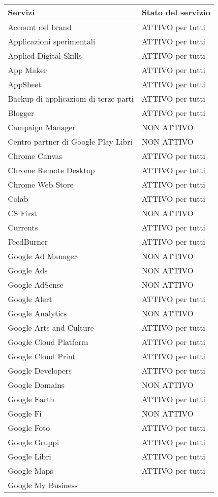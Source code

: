 \begin{center}
	\begin{tabular}{ll}
	\toprule
	Servizi&Stato del servizio\\
	\midrule 
Account del brand&
ATTIVO per tutti\\
Applicazioni sperimentali&
ATTIVO per tutti\\
Applied Digital Skills&
ATTIVO per tutti\\
App Maker&
ATTIVO per tutti\\
AppSheet&
ATTIVO per tutti\\
Backup di applicazioni di terze parti&
ATTIVO per tutti\\
Blogger&
ATTIVO per tutti\\
Campaign Manager&
NON ATTIVO\\
Centro partner di Google Play Libri&
NON ATTIVO\\
Chrome Canvas&
ATTIVO per tutti\\
Chrome Remote Desktop&
ATTIVO per tutti\\
Chrome Web Store&
ATTIVO per tutti\\
Colab&
ATTIVO per tutti\\
CS First&
NON ATTIVO\\
Currents&
ATTIVO per tutti\\
FeedBurner&
ATTIVO per tutti\\
Google Ad Manager&
NON ATTIVO\\
Google Ads&
NON ATTIVO\\
Google AdSense&
NON ATTIVO\\
Google Alert&
ATTIVO per tutti\\
Google Analytics&
NON ATTIVO\\
Google Arts and Culture&
ATTIVO per tutti\\
Google Cloud Platform&
ATTIVO per tutti\\
Google Cloud Print&
ATTIVO per tutti\\
Google Developers&
ATTIVO per tutti\\
Google Domains&
NON ATTIVO\\
Google Earth&
ATTIVO per tutti\\
Google Fi&
NON ATTIVO\\
Google Foto&
ATTIVO per tutti\\
Google Gruppi&
ATTIVO per tutti\\
Google Libri&
ATTIVO per tutti\\
Google Maps&
ATTIVO per tutti\\
Google My Business&

\end{tabular}
\end{center}
